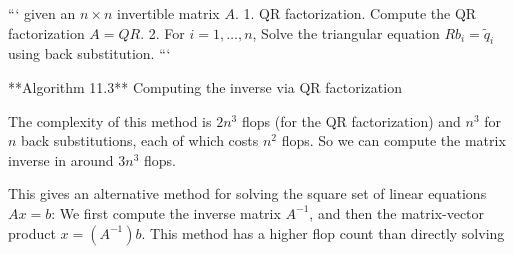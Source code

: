 ``` given an \(n\times n\) invertible matrix \(A\).
1. QR factorization. Compute the QR factorization \(A=QR\).
2. For \(i=1,\ldots,n\), Solve the triangular equation \(Rb_{i}=\tilde{q}_{i}\) using back substitution. ```

**Algorithm 11.3** Computing the inverse via QR factorization

The complexity of this method is \(2n^{3}\) flops (for the QR factorization) and \(n^{3}\) for \(n\) back substitutions, each of which costs \(n^{2}\) flops. So we can compute the matrix inverse in around \(3n^{3}\) flops.

This gives an alternative method for solving the square set of linear equations \(Ax=b\): We first compute the inverse matrix \(A^{-1}\), and then the matrix-vector product \(x=(A^{-1})b\). This method has a higher flop count than directly solving 